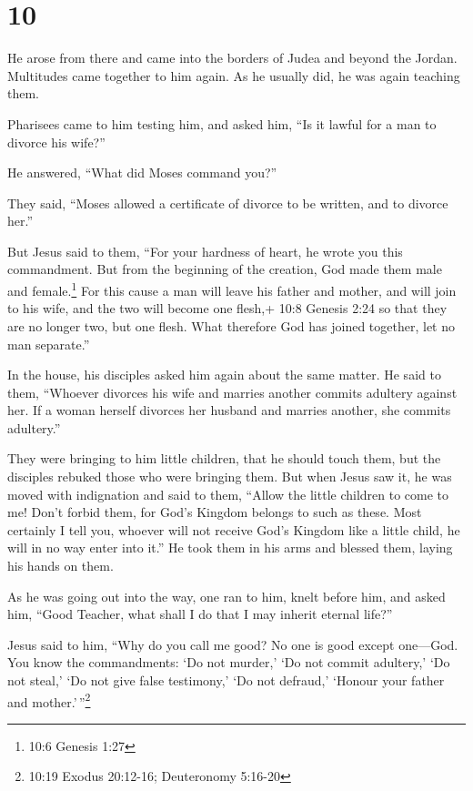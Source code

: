 \hypertarget{section-9}{%
\section{10}\label{section-9}}

 He arose from there and came into the borders of Judea and
beyond the Jordan. Multitudes came together to him again. As he usually
did, he was again teaching them.

 Pharisees came to him testing him, and asked him, ``Is it
lawful for a man to divorce his wife?''

 He answered, ``What did Moses command you?''

 They said, ``Moses allowed a certificate of divorce to be
written, and to divorce her.''

 But Jesus said to them, ``For your hardness of heart, he
wrote you this commandment.  But from the beginning of the
creation, God made them male and female.\footnote{10:6 Genesis 1:27}
 For this cause a man will leave his father and mother, and
will join to his wife,  and the two will become one flesh,+
10:8 Genesis 2:24 so that they are no longer two, but one flesh.
 What therefore God has joined together, let no man
separate.''

 In the house, his disciples asked him again about the same
matter.  He said to them, ``Whoever divorces his wife and
marries another commits adultery against her.  If a woman
herself divorces her husband and marries another, she commits
adultery.''

 They were bringing to him little children, that he should
touch them, but the disciples rebuked those who were bringing them.
 But when Jesus saw it, he was moved with indignation and
said to them, ``Allow the little children to come to me! Don't forbid
them, for God's Kingdom belongs to such as these.  Most
certainly I tell you, whoever will not receive God's Kingdom like a
little child, he will in no way enter into it.''  He took
them in his arms and blessed them, laying his hands on them.

 As he was going out into the way, one ran to him, knelt
before him, and asked him, ``Good Teacher, what shall I do that I may
inherit eternal life?''

 Jesus said to him, ``Why do you call me good? No one is
good except one---God.  You know the commandments: `Do not
murder,' `Do not commit adultery,' `Do not steal,' `Do not give false
testimony,' `Do not defraud,' `Honour your father and
mother.'\,''\footnote{10:19 Exodus 20:12-16; Deuteronomy 5:16-20}

